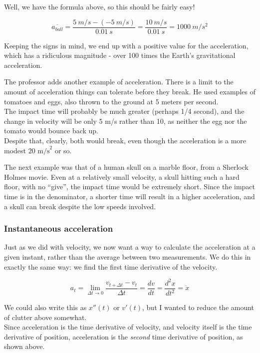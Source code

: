 Well, we have the formula above, so this should be fairly easy!

\begin{equation}
 \overbar{a_{ball}} = \frac{\SI{5}{m/s} - (\SI{-5}{m/s})}{\SI{0.01}{s}} = \frac{\SI{10}{m/s}}{\SI{0.01}{s}} = \SI{1000}{m/s^2}
\end{equation}

Keeping the signs in mind, we end up with a positive value for the acceleration, which has a ridiculous magnitude - over 100 times the Earth's gravitational acceleration.

The professor adds another example of acceleration. There is a limit to the amount of acceleration things can tolerate before they break. He used examples of tomatoes and eggs, also thrown to the ground at 5 meters per second.\\
The impact time will probably be much greater (perhaps 1/4 second), and the change in velocity will be only 5 m/s rather than 10, as neither the egg nor the tomato would bounce back up.\\
Despite that, clearly, both would break, even though the acceleration is a more modest $20 \text{ m/s}^2$ or so.

The next example was that of a human skull on a marble floor, from a Sherlock Holmes movie. Even at a relatively small velocity, a skull hitting such a hard floor, with no ``give'', the impact time would be extremely short. Since the impact time is in the denominator, a shorter time will result in a higher acceleration, and a skull can break despite the low speeds involved. 

\subsubsection{Instantaneous acceleration}

Just as we did with velocity, we now want a way to calculate the acceleration at a given instant, rather than the average between two measurements. We do this in exactly the same way: we find the first time derivative of the velocity.

\begingroup
\large
\begin{equation}
 a_t = \lim_{\Delta t \to 0} \frac{v_{t + \Delta t} - v_t}{\Delta t} = \frac{dv}{dt} = \frac{d^2x}{dt^2} = \ddot{x}
\end{equation}
\endgroup

We could also write this as $x''(t)$ or $v'(t)$, but I wanted to reduce the amount of clutter above somewhat.\\
Since acceleration is the time derivative of velocity, and velocity itself is the time derivative of position, acceleration is the \emph{second} time derivative of position, as shown above.

